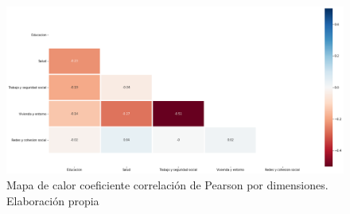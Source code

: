 \documentclass[12pt,letterpaper,spanish]{article}
\begin{document}
\begin{enumerate}
\begin{figure}[H]
    \centering
        \includegraphics[width=\linewidth]{Heatmaps/Heatmap_pearson_DIM.png}
    \caption{Mapa de calor coeficiente correlación de Pearson por dimensiones. Elaboración propia}
    \label{PearsonDim}
\end{figure}


\end{enumerate}
\end{document}
